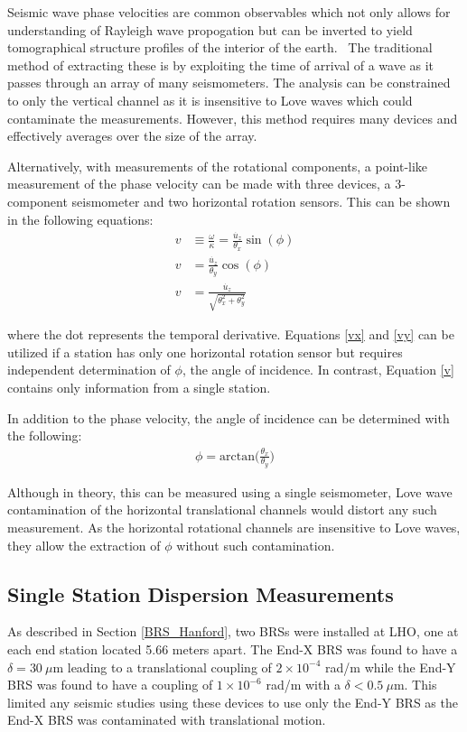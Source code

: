 \documentclass [12pt, proquest]{uwthesis}[2019]
\begin{document}
Seismic wave phase velocities are common observables which not only allows for understanding of Rayleigh wave propogation but can be inverted to yield tomographical structure profiles of the interior of the earth.~\cite{tomography} The traditional method of extracting these is by exploiting the time of arrival of a wave as it passes through an array of many seismometers. The analysis can be constrained to only the vertical channel as it is insensitive to Love waves which could contaminate the measurements. However, this method requires many devices and effectively averages over the size of the array.

Alternatively, with measurements of the rotational components, a point-like measurement of the phase velocity can be made with three devices, a 3-component seismometer and two horizontal rotation sensors. This can be shown in the following equations:
\begin{align} 
v&\equiv\frac{\omega}{\kappa} = \frac{\dot{u_z}}{\theta_x}\sin(\phi) \label{vx} \\
v&=\frac{\dot{u_z}}{\theta_y}\cos(\phi)\label{vy} \\
v&=\frac{\dot{u_z}}{\sqrt{\theta_x^2+\theta_y^2}} \label{v}
\end{align}

where the dot represents the temporal derivative. Equations \ref{vx} and \ref{vy} can be utilized if a station has only one horizontal rotation sensor but requires independent determination of $\phi$, the angle of incidence. In contrast, Equation \ref{v} contains only information from a single station.

In addition to the phase velocity, the angle of incidence can be determined with the following:
\begin{align}
\phi=\text{arctan}\bigg(\frac{\theta_x}{\theta_y}\bigg)
\end{align}

Although in theory, this can be measured using a single seismometer, Love wave contamination of the horizontal translational channels would distort any such measurement. As the horizontal rotational channels are insensitive to Love waves, they allow the extraction of $\phi$ without such contamination.  

\subsection{Single Station Dispersion Measurements}
As described in Section \ref{BRS_Hanford}, two BRSs were installed at LHO, one at each end station located 5.66 meters apart. The End-X BRS was found to have a $\delta=30\ \mu \text{m}$ leading to a translational coupling of $2 \times 10^{-4}$ rad/m while the End-Y BRS was found to have a coupling of $1 \times 10^{-6}$ rad/m with a $\delta<0.5\ \mu \text{m}$. This limited any seismic studies using these devices to use only the End-Y BRS as the End-X BRS was contaminated with translational motion. 
\end{document}
